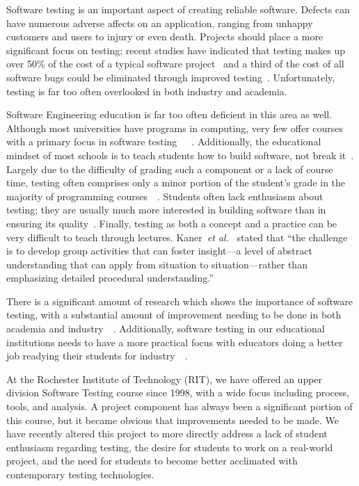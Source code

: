 \documentclass{sig-alternate}
\begin{document}
Software testing is an important aspect of creating reliable software. Defects can have numerous adverse affects on an application, ranging from unhappy customers and users to injury or even death. Projects should place a more significant focus on testing; recent studies have indicated that testing makes up over 50\% of the cost of a typical software project~\cite{Osterweil:1996:SDS:242223.242288} and a third of the cost of all software bugs could be eliminated through improved testing~\cite{5876141}. Unfortunately, testing is far too often overlooked in both industry and academia.

Software Engineering education is far too often deficient in this area as well. Although most universities have programs in computing, very few offer courses with a primary focus in software testing~\cite{krutz_BotD}~\cite{Myers:2004:AST:983238}~\cite{Shepard:2001:MTT:376134.376180}. Additionally, the educational mindset of most schools is to teach students how to build software, not break it~\cite{Meneely:2013:VDC:2486788.2486948}.
Largely due to the difficulty of grading such a component or a lack of course time, testing often comprises only a minor portion of the student's grade in the majority of programming courses~\cite{Smith:2012:UPR:2361276.2361295}~\cite{Kazemian:2005:STC:1113847.1113876}. Students often lack enthusiasm about testing; they are usually much more interested in building software than in ensuring its quality~\cite{Clark:2004:PTS:979968.979974}. Finally, testing as both a concept and a practice can be very difficult to teach through lectures. Kaner~\emph{et al.}~\cite{4271602}  stated that ``the challenge is to develop group activities that can foster insight---a level of abstract understanding that can apply from situation to situation---rather than emphasizing detailed procedural understanding.''

There is a significant amount of research which shows the importance of software testing, with a substantial amount of improvement needing to be done in both academia and industry~\cite{Osterweil:1996:SDS:242223.242288}~\cite{4722985}. Additionally, software testing in our educational institutions needs to have a more practical focus with educators doing a better job readying their students for industry~\cite{Whittaker:2000:STW:624635.626090}~\cite{Jones:2001:PTS:374824.374715}.

At the Rochester Institute of Technology (RIT), we have offered an upper division Software Testing course since 1998, with a wide focus including process, tools, and analysis. A project component has always been a significant portion of this course, but it became obvious that improvements needed to be made. We have recently altered this project to more directly address a lack of student enthusiasm regarding testing, the desire for students to work on a real-world project, and the need for students to become better acclimated with contemporary testing technologies.
\end{document}
